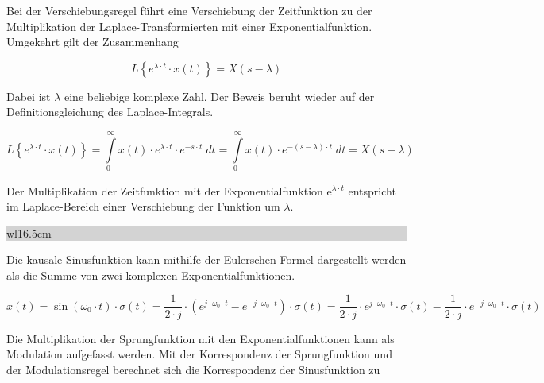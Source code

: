 \noindent Bei der Verschiebungsregel führt eine Verschiebung der Zeitfunktion zu der Multiplikation der Laplace-Transformierten mit einer Exponentialfunktion. Umgekehrt gilt der Zusammenhang

\begin{equation}\label{eq:fourfourtyone}
L\left\{e^{\lambda \cdot t} \cdot x\left(t\right)\right\}=X\left(s-\lambda \right)
\end{equation}

\noindent Dabei ist $\lambda$ eine beliebige komplexe Zahl. Der Beweis beruht wieder auf der Definitionsgleichung des Laplace-Integrals.

\begin{equation}\label{eq:fourfourtytwo}
L\left\{e^{\lambda \cdot t} \cdot x\left(t\right)\right\}=\int\limits _{0_{-} }^{\infty }x\left(t\right)\cdot e^{\lambda \cdot t} \cdot e^{-s\cdot t}\; dt=\int\limits _{0_{-} }^{\infty }x\left(t\right)\cdot e^{-(s-\lambda )\cdot t}\; dt=X\left(s-\lambda \right)
\end{equation}

\noindent Der Multiplikation der Zeitfunktion mit der Exponentialfunktion e$^{\lambda\cdot t}$ entspricht im Laplace-Bereich einer Verschiebung der Funktion um $\lambda$.\bigskip

\noindent
\colorbox{lightgray}{%
%
\renewcommand\arraystretch{0.6}%
\begin{tabular}{ wl{16.5cm} }
{\selectfont{Beispiel: Modulationsregel der Laplace-Transformation}}
\end{tabular}%
}\bigskip

\noindent Die kausale Sinusfunktion kann mithilfe der Eulerschen Formel dargestellt werden als die Summe von
zwei komplexen Exponentialfunktionen.

\begin{equation}\label{eq:fourfourtythree}
x\left(t\right)=\sin \left(\omega _{0} \cdot t\right)\cdot \sigma \left(t\right)=\frac{1}{2\cdot j} \cdot \left(e^{j\cdot \omega _{0} \cdot t} -e^{-j\cdot \omega _{0} \cdot t} \right)\cdot \sigma \left(t\right)=\frac{1}{2\cdot j} \cdot e^{j\cdot \omega _{0} \cdot t} \cdot \sigma \left(t\right)-\frac{1}{2\cdot j} \cdot e^{-j\cdot \omega _{0} \cdot t} \cdot \sigma \left(t\right)
\end{equation}

\noindent Die Multiplikation der Sprungfunktion mit den Exponentialfunktionen kann als Modulation aufgefasst werden. Mit der Korrespondenz der Sprungfunktion und der Modulationsregel berechnet sich die Korrespondenz der Sinusfunktion zu


